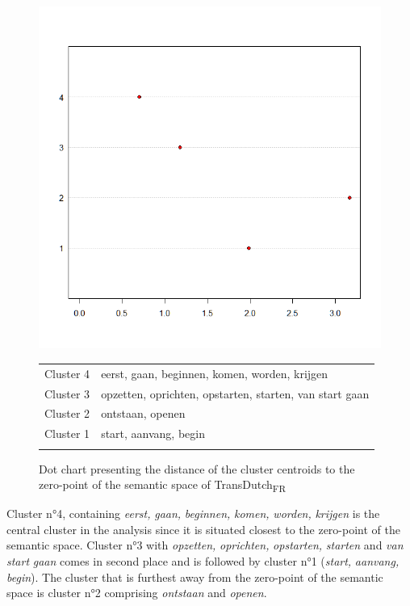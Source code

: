 \begin{figure}
\includegraphics[height=.4\textheight]{figures/Vandevoorde2-img81.png}
\scriptsize
\begin{tabular}{ll}
\lsptoprule
Cluster 4 & eerst, gaan, beginnen, komen, worden, krijgen\\
Cluster 3 & opzetten, oprichten, opstarten, starten, van start gaan\\
Cluster 2 & ontstaan, openen\\
Cluster 1 & start, aanvang, begin\\
\lspbottomrule
\end{tabular}
\normalsize
\caption{\label{fig:4:78}  Dot chart presenting the distance of the cluster centroids to the zero-point of the semantic space of TransDutch\textsubscript{FR}}
\end{figure}

Cluster n°4, containing \textit{eerst,} \textit{gaan,} \textit{beginnen,} \textit{komen,} \textit{worden,} \textit{krijgen} is the central cluster in the analysis since it is situated closest to the zero-point of the semantic space. Cluster n°3 with \textit{opzetten,} \textit{oprichten,} \textit{opstarten,} \textit{starten} and \textit{van} \textit{start} \textit{gaan} comes in second place and is followed by cluster n°1 (\textit{start,} \textit{aanvang,} \textit{begin}). The cluster that is furthest away from the zero-point of the semantic space is cluster n°2 comprising \textit{ontstaan} and \textit{openen}.

